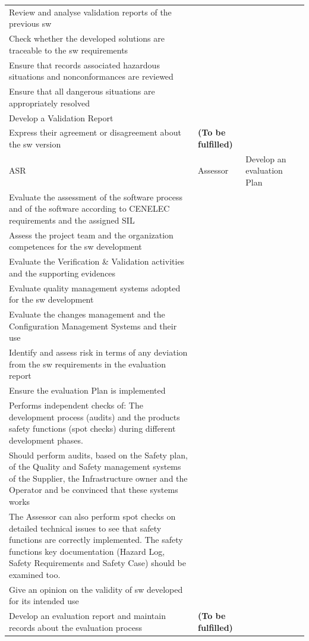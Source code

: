 \documentclass{template/openetcs_article}
\begin{document}
\begin{landscape}
\begin{flushleft}
\begin{supertabular}[H]{|m{1cm}|m{2,5cm}|m{15cm}|m{6cm}|}
Review and analyse validation reports of the previous sw\\
Check whether the developed solutions are traceable to the sw requirements \\
Ensure that records associated hazardous situations and nonconformances are reviewed\\
Ensure that all dangerous situations are appropriately resolved\\
Develop a Validation Report\\
Express their agreement or disagreement about the sw version  &
\textbf{(To be fulfilled)}
\\\hline
ASR &
Assessor &
\raggedright
Develop an evaluation Plan\\
Evaluate the assessment of the software process and of the software according to CENELEC requirements and the assigned SIL\\
Assess the project team and the organization competences for the sw development\\
Evaluate the Verification \& Validation activities and the supporting evidences\\
Evaluate quality management systems adopted for  the sw development\\
Evaluate the changes management and the Configuration Management Systems and their use\\
Identify and assess risk in terms of any deviation from the sw requirements in the evaluation report\\
Ensure the evaluation Plan is implemented\\
Performs independent checks of: The development process (audits) and the products safety functions (spot checks) during different development phases.\\
Should perform audits, based on the Safety plan, of the Quality and Safety management systems of the Supplier, the Infrastructure owner and the Operator and be convinced that these systems works\\
The Assessor can also perform spot checks on detailed technical issues to see that safety functions are correctly implemented. The safety functions key documentation (Hazard Log, Safety Requirements and Safety Case) should be examined too.\\
Give an opinion on the validity of sw developed for its intended use\\
Develop an evaluation report and maintain records about the evaluation process
&
\textbf{(To be fulfilled)}
\\\hline

\end{supertabular}
\end{flushleft}
\end{landscape}
\end{document}

